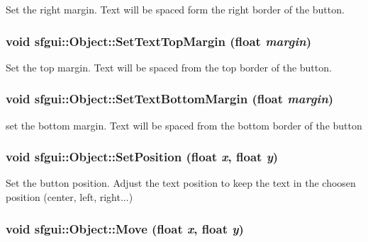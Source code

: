Set the right margin. Text will be spaced form the right border of the button. \hypertarget{classsfgui_1_1Object_6c3eb411a957d05707d858ded4cd951c}{
\subsubsection[SetTextTopMargin]{\setlength{\rightskip}{0pt plus 5cm}void sfgui::Object::SetTextTopMargin (float {\em margin})}}
\label{classsfgui_1_1Object_6c3eb411a957d05707d858ded4cd951c}




Set the top margin. Text will be spaced from the top border of the button. \hypertarget{classsfgui_1_1Object_db61eb19249fbbd28462cc79ca17b738}{
\subsubsection[SetTextBottomMargin]{\setlength{\rightskip}{0pt plus 5cm}void sfgui::Object::SetTextBottomMargin (float {\em margin})}}
\label{classsfgui_1_1Object_db61eb19249fbbd28462cc79ca17b738}




set the bottom margin. Text will be spaced from the bottom border of the button \hypertarget{classsfgui_1_1Object_664c57bd35504a7d00963980d68dd022}{
\subsubsection[SetPosition]{\setlength{\rightskip}{0pt plus 5cm}void sfgui::Object::SetPosition (float {\em x}, \/  float {\em y})}}
\label{classsfgui_1_1Object_664c57bd35504a7d00963980d68dd022}




Set the button position. Adjust the text position to keep the text in the choosen position (center, left, right...) \hypertarget{classsfgui_1_1Object_70b15fba99da515808d3da7d8042f458}{
\subsubsection[Move]{\setlength{\rightskip}{0pt plus 5cm}void sfgui::Object::Move (float {\em x}, \/  float {\em y})}}
\label{classsfgui_1_1Object_70b15fba99da515808d3da7d8042f458}




